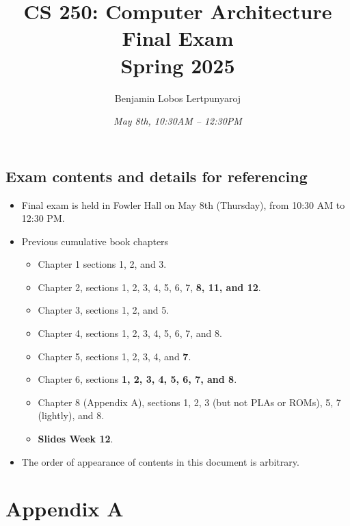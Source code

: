 \documentclass[11pt]{article}
\title{\textbf{CS 250: Computer Architecture\\Final Exam\\Spring 2025}}
\author{Benjamin Lobos Lertpunyaroj}
\date{\textit{May 8th, 10:30{\tiny AM} – 12:30{\tiny PM}}}
\begin{document}
\maketitle

\vspace{-2em}

\begin{center}
\section*{Exam contents and details for referencing}
\end{center}

\begin{itemize}[itemsep=-0.5em, left=0pt, label={•}]
    \item Final exam is held in Fowler Hall on May 8th (Thursday), from 10:30 {\tiny AM} to 12:30 {\tiny PM}.
    \item Previous cumulative book chapters
    \vspace{-0.8em}
    \begin{itemize}[itemsep=-0.5em, left=0pt, label={•}]
    \item Chapter 1 sections 1, 2, and 3.
    \item Chapter 2, sections 1, 2, 3, 4, 5, 6, 7, \textbf{8, 11, and 12}.
    \item Chapter 3, sections 1, 2, and 5.
    \item Chapter 4, sections 1, 2, 3, 4, 5, 6, 7, and 8.
    \item Chapter 5, sections 1, 2, 3, 4, and \textbf{7}.
    \item Chapter 6, sections \textbf{1, 2, 3, 4, 5, 6, 7, and 8}.
    \item Chapter 8 (Appendix A), sections 1, 2, 3 (but not PLAs or ROMs), 5, 7 (lightly), and 8.
    \item \textbf{Slides Week 12}.
    \end{itemize}
    \item The order of appearance of contents in this document is arbitrary.
\end{itemize}

\pagebreak
\tableofcontents

\pagebreak

\section*{Appendix A}
\end{document}
